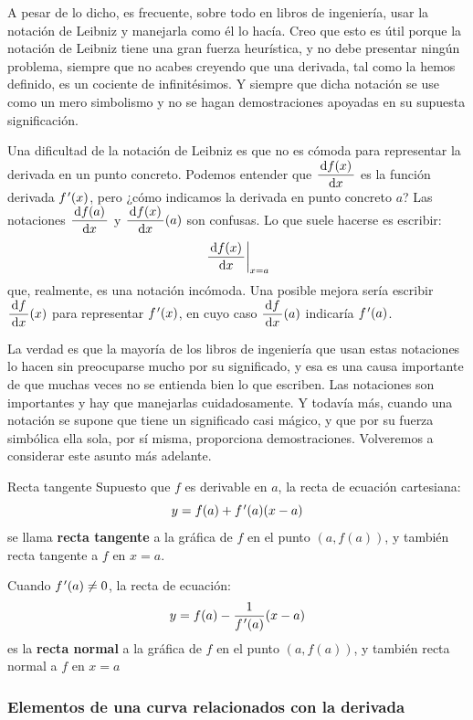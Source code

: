 A pesar de lo dicho, es frecuente, sobre todo en libros de ingeniería,
usar la notación de Leibniz y manejarla como él lo hacía. Creo que
esto es útil porque la notación de Leibniz tiene una gran fuerza heurística,
y no debe presentar ningún problema, siempre que no acabes creyendo
que una derivada, tal como la hemos definido, es un cociente de infinitésimos.
Y siempre que dicha notación se use como un mero simbolismo y no se
hagan demostraciones apoyadas en su supuesta significación.

Una dificultad de la notación de Leibniz es que no es cómoda para
representar la derivada en un punto concreto. Podemos entender que
$\dfrac{\,\mathrm{d}f(x)\,}{\,\mathrm{d}x\,}$ es la función derivada $f\mbox{$^{\mspace{2mu}\prime}$}(x)$, pero
¿cómo indicamos la derivada en punto concreto $a$? Las notaciones
$\dfrac{\,\mathrm{d}f(a)\,}{\,\mathrm{d}x\,}$ y $\dfrac{\,\mathrm{d}f(x)\,}{\,\mathrm{d}x\,}(a)$ son
confusas. Lo que suele hacerse es escribir: 
\[
\left.\dfrac{\,\mathrm{d}f(x)\,}{\,\mathrm{d}x\,}\right|_{x=a}
\]
que, realmente, es una notación incómoda. Una posible mejora sería
escribir $\dfrac{\,\mathrm{d}f\,}{\,\mathrm{d}x\,}(x)$ para representar $f\mbox{$^{\mspace{2mu}\prime}$}(x)$,
en cuyo caso $\dfrac{\,\mathrm{d}f\,}{\,\mathrm{d}x\,}(a)$ indicaría $f\mbox{$^{\mspace{2mu}\prime}$}(a)$.

La verdad es que la mayoría de los libros de ingeniería que usan estas
notaciones lo hacen sin preocuparse mucho por su significado, y esa
es una causa importante de que muchas veces no se entienda bien lo
que escriben. Las notaciones son importantes y hay que manejarlas
cuidadosamente. Y todavía más, cuando una notación se supone que tiene
un significado casi mágico, y que por su fuerza simbólica ella sola,
por sí misma, proporciona demostraciones. Volveremos a considerar
este asunto más adelante.

\begin{defi}{Recta tangente}{} Supuesto que $f$ es derivable en
$a$, la recta de ecuación cartesiana: 
\[
y=f(a)+f\mbox{$^{\mspace{2mu}\prime}$}(a)(x-a)
\]
se llama \textbf{recta tangente} a la gráfica de $f$ en el punto
$(a,f(a))$, y también recta tangente a $f$ en $x=a$.

Cuando $f\mbox{$^{\mspace{2mu}\prime}$}(a)\neq0$, la recta de ecuación: 
\[
y=f(a)-\dfrac{1}{f\mbox{$^{\mspace{2mu}\prime}$}(a)}(x-a)
\]
es la \textbf{recta normal} a la gráfica de $f$ en el punto $(a,f(a))$,
y también recta normal a $f$ en $x=a$ \end{defi}

\subsubsection{Elementos de una curva relacionados con la derivada}

